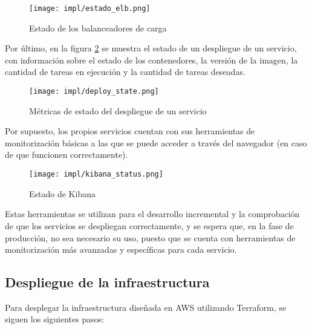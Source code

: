 \begin{figure}[H]
	\centering
	\texttt{[image: impl/estado\_elb.png]}
	\caption{Estado de los balanceadores de carga}
	\label{fig:estado_elb}
\end{figure}

Por último, en la figura \ref{fig:deploy_state} se muestra el estado de un
despliegue de un servicio, con información sobre el estado de los contenedores,
la versión de la imagen, la cantidad de tareas en ejecución y la cantidad de
tareas deseadas.

\begin{figure}[H]
	\centering
	\texttt{[image: impl/deploy\_state.png]}
	\caption{Métricas de estado del despliegue de un servicio}
	\label{fig:deploy_state}
\end{figure}

Por supuesto, los propios servicios cuentan con sus herramientas de
monitorización básicas a las que se puede acceder a través del navegador (en
caso de que funcionen correctamente).

\begin{figure}[H]
	\centering
	\texttt{[image: impl/kibana\_status.png]}
	\caption{Estado de Kibana}
	\label{fig:kibana_status}
\end{figure}

Estas herramientas se utilizan para el desarrollo incremental y la comprobación
de que los servicios se despliegan correctamente, y se espera que, en la fase de
producción, no sea necesario su uso, puesto que se cuenta con herramientas de
monitorización más avanzadas y específicas para cada servicio.

\newpage{}
\subsection{Despliegue de la infraestructura}\label{subsec:impl_cloud_despliegue}
Para desplegar la infraestructura diseñada en AWS utilizando Terraform, se
siguen los siguientes pasos:

